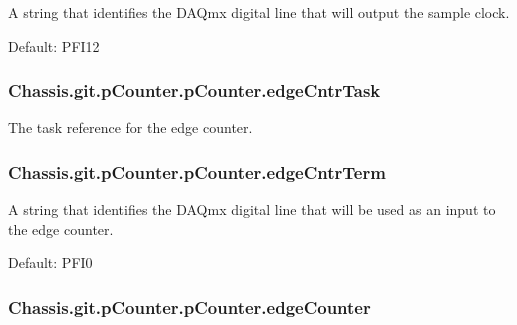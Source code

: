A string that identifies the D\-A\-Qmx digital line that will output the sample clock. 

Default\-: P\-F\-I12 \hypertarget{class_chassis_8git_1_1p_counter_1_1p_counter_aa9f5bba0fb4280d94d7e800a02f0b941}{
\subsubsection[{edge\-Cntr\-Task}]{\setlength{\rightskip}{0pt plus 5cm}Chassis.\-git.\-p\-Counter.\-p\-Counter.\-edge\-Cntr\-Task}}\label{class_chassis_8git_1_1p_counter_1_1p_counter_aa9f5bba0fb4280d94d7e800a02f0b941}


The task reference for the edge counter. 

\hypertarget{class_chassis_8git_1_1p_counter_1_1p_counter_abcaca1083cd7a8476fb6ecb127761640}{
\subsubsection[{edge\-Cntr\-Term}]{\setlength{\rightskip}{0pt plus 5cm}Chassis.\-git.\-p\-Counter.\-p\-Counter.\-edge\-Cntr\-Term}}\label{class_chassis_8git_1_1p_counter_1_1p_counter_abcaca1083cd7a8476fb6ecb127761640}


A string that identifies the D\-A\-Qmx digital line that will be used as an input to the edge counter. 

Default\-: P\-F\-I0 \hypertarget{class_chassis_8git_1_1p_counter_1_1p_counter_a6a6ad59340a0bdbce0e21115116cd10c}{
\subsubsection[{edge\-Counter}]{\setlength{\rightskip}{0pt plus 5cm}Chassis.\-git.\-p\-Counter.\-p\-Counter.\-edge\-Counter}}\label{class_chassis_8git_1_1p_counter_1_1p_counter_a6a6ad59340a0bdbce0e21115116cd10c}


